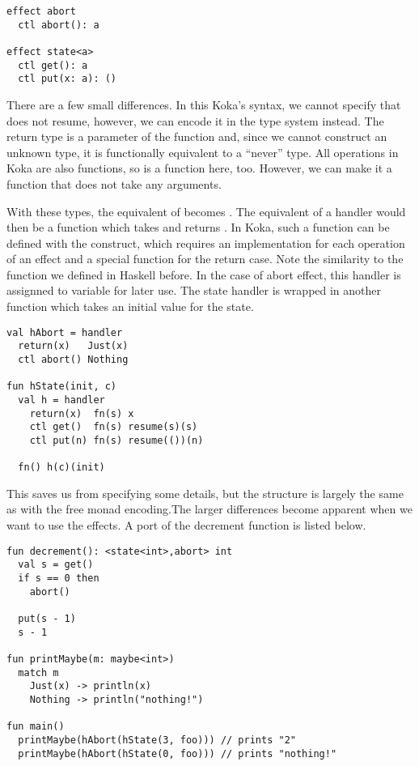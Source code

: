\begin{lstlisting}[language=koka,style=fancy]
effect abort
  ctl abort(): a

effect state<a>
  ctl get(): a
  ctl put(x: a): ()
\end{lstlisting}

There are a few small differences. In this Koka's syntax, we cannot specify that  does not resume, however, we can encode it in the type system instead. The return type  is a parameter of the function and, since we cannot construct an unknown type, it is functionally equivalent to a ``never'' type. All operations in Koka are also functions, so  is a function here, too. However, we can make it a function that does not take any arguments.

With these types, the equivalent of  becomes . The equivalent of a handler would then be a function which takes  and returns . In Koka, such a function can be defined with the  construct, which requires an implementation for each operation of an effect and a special function for the return case. Note the similarity to the  function we defined in Haskell before. In the case of abort effect, this handler is assignned to variable for later use. The state handler is wrapped in another function which takes an initial value for the state.

\begin{lstlisting}[language=koka,style=fancy]
val hAbort = handler
  return(x)   Just(x)
  ctl abort() Nothing

fun hState(init, c)
  val h = handler
    return(x)  fn(s) x
    ctl get()  fn(s) resume(s)(s)
    ctl put(n) fn(s) resume(())(n)

  fn() h(c)(init)
\end{lstlisting}

This saves us from specifying some details, but the structure is largely the same as with the free monad encoding.The larger differences become apparent when we want to use the effects. A port of the decrement function is listed below.

\begin{lstlisting}[language=koka,style=fancy]
fun decrement(): <state<int>,abort> int
  val s = get()
  if s == 0 then
    abort()
  
  put(s - 1)
  s - 1 

fun printMaybe(m: maybe<int>)
  match m
    Just(x) -> println(x)
    Nothing -> println("nothing!")

fun main()
  printMaybe(hAbort(hState(3, foo))) // prints "2"
  printMaybe(hAbort(hState(0, foo))) // prints "nothing!"
\end{lstlisting}

